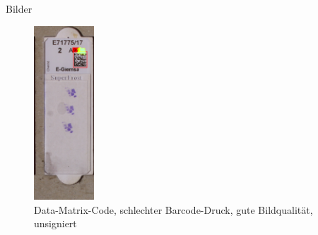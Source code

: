\documentclass{beamer}
\begin{document}
\begin{frame}{Bilder}
\begin{figure}
      \hfill
      \includegraphics[width=0.2\textwidth]{./assets/Cell100884_1_5_top1_prosconsminweight.PNG}
      \caption{Data-Matrix-Code, schlechter Barcode-Druck, gute Bildqualität, unsigniert}
    \end{figure}
  \end{frame}
\end{document}
